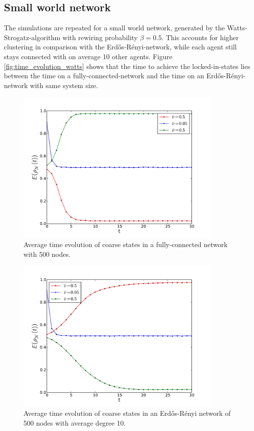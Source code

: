 \documentclass[]{article}
\begin{document}
\subsection{Small world network}

The simulations are repeated for a small world network, generated by the Watts-Strogatz-algorithm with rewiring probability $\beta=0.5$. This accounts for higher clustering in comparison with the Erd\H{o}s-Rényi-network, while each agent still stays connected with on average 10 other agents. Figure \ref{fig:time_evolution_watts} shows that the time to achieve the locked-in-states lies between the time on a fully-connected-network and the time on an Erd\H{o}s-Rényi-network with same system size. 


\begin{figure}


\includegraphics[width=0.9\textwidth]{time_evolution_M250_N500.pdf}
\caption{Average time evolution of coarse states in a fully-connected network with 500 nodes.}
\label{fig:time_evolution}
\end{figure}


\begin{figure}
\includegraphics[width=0.9\textwidth]{time_evolution_erdos10_M250_N500.pdf}
\caption{Average time evolution of coarse states in an Erd\H{o}s-Rényi network of 500 nodes with average degree 10.}
\label{fig:time_evolution_erdos}
\end{figure}
\end{document}
